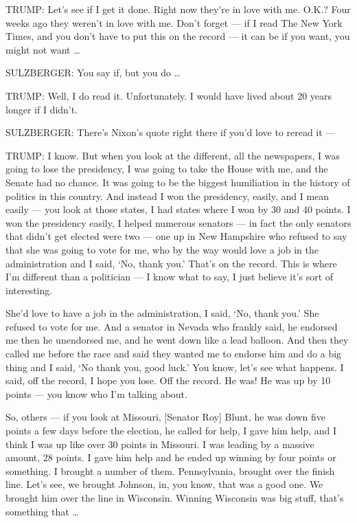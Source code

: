 TRUMP: Let's see if I get it done. Right now they're in love with me.
O.K.? Four weeks ago they weren't in love with me. Don't forget --- if I
read The New York Times, and you don't have to put this on the record
--- it can be if you want, you might not want \ldots{}

SULZBERGER: You say if, but you do \ldots{}

TRUMP: Well, I do read it. Unfortunately. I would have lived about 20
years longer if I didn't.

SULZBERGER: There's Nixon's quote right there if you'd love to reread it
---

TRUMP: I know. But when you look at the different, all the newspapers, I
was going to lose the presidency, I was going to take the House with me,
and the Senate had no chance. It was going to be the biggest humiliation
in the history of politics in this country. And instead I won the
presidency, easily, and I mean easily --- you look at those states, I
had states where I won by 30 and 40 points. I won the presidency easily,
I helped numerous senators --- in fact the only senators that didn't get
elected were two --- one up in New Hampshire who refused to say that she
was going to vote for me, who by the way would love a job in the
administration and I said, `No, thank you.' That's on the record. This
is where I'm different than a politician --- I know what to say, I just
believe it's sort of interesting.

She'd love to have a job in the administration, I said, `No, thank you.'
She refused to vote for me. And a senator in Nevada who frankly said, he
endorsed me then he unendorsed me, and he went down like a lead balloon.
And then they called me before the race and said they wanted me to
endorse him and do a big thing and I said, `No thank you, good luck.'
You know, let's see what happens. I said, off the record, I hope you
lose. Off the record. He was! He was up by 10 points --- you know who
I'm talking about.

So, others --- if you look at Missouri, {[}Senator Roy{]} Blunt, he was
down five points a few days before the election, he called for help, I
gave him help, and I think I was up like over 30 points in Missouri. I
was leading by a massive amount, 28 points. I gave him help and he ended
up winning by four points or something. I brought a number of them.
Pennsylvania, brought over the finish line. Let's see, we brought
Johnson, in, you know, that was a good one. We brought him over the line
in Wisconsin. Winning Wisconsin was big stuff, that's something that
\ldots{}

